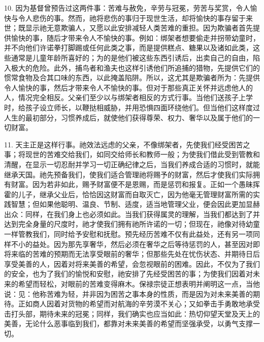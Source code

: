 10. 因为基督曾预告过这两件事：苦难与赦免，辛劳与冠冕，劳苦与奖赏，令人愉快与令人悲伤的事。然而，祂将悲伤的事归于现世生活，却将愉快的事存留于来世；既显示祂无意欺骗人，又愿以此安排减轻人类苦难的重担。因为欺骗者首先提供愉快的事，随后才带来令人不愉快的事。例如：绑架者想要偷走并拐带幼童时，并不向他们许诺拳打脚踢或任何此类之事，而是提供糕点、糖果以及诸如此类，这些通常是儿童年龄所喜好的；为的是他们被这些东西引诱后，出卖自己的自由，陷入极大的危险。此外，捕鸟者和渔夫也这样引诱他们所追捕的猎物，先提供它们的惯常食物及合其口味的东西，以此掩盖陷阱。所以，这尤其是欺骗者所为：先提供令人愉快的事，然后才带来令人不愉快的事。但对于那些真正关怀并远虑他人的人，情况完全相反。父亲们至少以与绑架者相反的方式行事。当他们送孩子上学时，给孩子设立师长，以鞭挞相威胁，并用恐惧四面环绕他们。但当他们这样度过人生的最初部分，习惯养成后，就使他们获得尊荣、权力、奢华以及属于他们的一切财富。\par

11. 天主正是这样行事。祂效法远虑的父亲，不像绑架者，先使我们经受困苦之事；将现世的苦难交给我们，如同交给师长和教师一般；为使我们借此受到管教和清醒，在显示一切忍耐并学习一切正确纪律之后，当我们养成合适的习惯时，就能继承天国。祂先预备我们，使我们适合管理祂将赐予的财富，然后才使我们实际拥有财富。因为若非如此，赐予财富便不是恩赐，而是惩罚和报复。正如一个愚昧挥霍的儿子，继承父业后，恰恰因这财富而自取灭亡，因为他毫无管理财富所需的实践智慧；但如果他聪明、温良、节制、适度，适当地管理父业，便会因此更加显赫出众：同样，在我们身上也必须如此。当我们获得属灵的理解，当我们都达到了并达到完全身量的尺度时，祂才使我们拥有祂所许诺的一切；但现在，祂像对待幼童一样管教我们，同时给予安慰和抚慰。预先经历苦难不仅有此益处，还有另一项同样不小的益处。因为那先享奢华，然后必须在奢华之后等待惩罚的人，甚至因对即将来临的苦难的预期而无法享受眼前的奢华；但那些先处在忧伤状态、并期待日后享受美善的人，因着对将来美善的希望，会忽视眼前的困难。因此，不仅为了我们的安全，也为了我们的愉悦和安慰，祂安排了先经受困苦的事；为使我们因着对未来的希望而轻松，对眼前的苦难变得麻木。保禄宗徒正想表明并阐明这一点，当他说：见：他称苦难为轻，并非因为困苦之事本身的性质，而是因为对未来美善的期待。正如商人因着对货物的希望而对航海的辛劳漠不关心；又如拳击手勇敢地承受击打头部，期待未来的冠冕；同样，我们确实也应当如此：热切仰望天堂及天上的美善，无论什么恶事临到我们，都靠对未来美善的希望而坚强承受，以勇气支撑一切。\par

